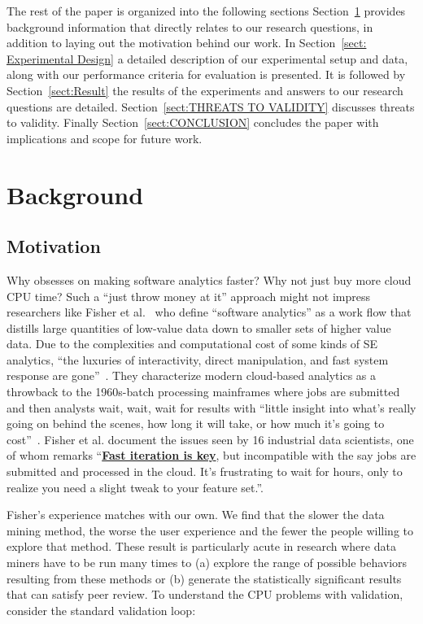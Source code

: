 \documentclass[sigconf]{acmart}
\theoremstyle{break}
\begin{document}
    The rest of the paper is organized into the following sections 
    Section~\ref{sect: Background and Motivation} provides background information  that directly relates to our research questions, in addition to laying out the motivation behind our work. In 
    Section~\ref{sect: Experimental Design} a detailed description of our experimental setup and data, along with our performance criteria for evaluation is presented. It is followed by 
    Section~\ref{sect:Result} the results of the experiments and answers to our research questions are detailed.
    Section~\ref{sect:THREATS TO VALIDITY} discusses threats to validity. Finally 
    Section~\ref{sect:CONCLUSION} concludes the paper with implications and scope for future work.
\section{Background  }
\label{sect: Background and Motivation}
   
    
\subsection{Motivation}
\label{sssec:Why We Need faster Models?}
    

    Why obsesses on making software analytics faster? Why not just  buy more cloud CPU time?
    Such a ``just throw money at it'' approach might not impress
    researchers like Fisher et al.~\cite{fisher2012interactions} who define ``software analytics'' as a work flow that distills large quantities of low-value
    data down to smaller sets of higher value data. Due to the complexities and computational cost of  some kinds of SE
    analytics, ``the luxuries of interactivity, direct manipulation, and fast system response are gone''~\cite{fisher2012interactions}. They
    characterize modern cloud-based analytics as a throwback to the 1960s-batch processing mainframes where
    jobs are submitted and then analysts wait, wait, wait for results with ``little insight into what's really going
    on behind the scenes, how long it will take, or how much it's going to cost''~\cite{fisher2012interactions}. Fisher et al. document
    the issues seen by 16 industrial data scientists, one of whom remarks ``\underline{{\bf Fast iteration is key}}, but incompatible
    with the say jobs are submitted and processed in the cloud. It's frustrating to wait for hours, only to realize
    you need a slight tweak to your feature set.''.
    
    Fisher's experience matches with our own.   We find that the slower the data mining method, the worse
    the user experience and the fewer the people willing to explore that method. These result is particularly
    acute in research where data miners have to be run many times to (a) explore the range of possible behaviors
    resulting from these methods or (b) generate the statistically significant results that can satisfy peer review.
    To understand the CPU problems with validation, consider the standard validation loop:
    
\end{document}
